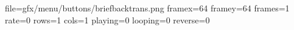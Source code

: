 file=gfx/menu/buttons/briefbacktrans.png
framex=64
framey=64
frames=1
rate=0
rows=1
cols=1
playing=0
looping=0
reverse=0